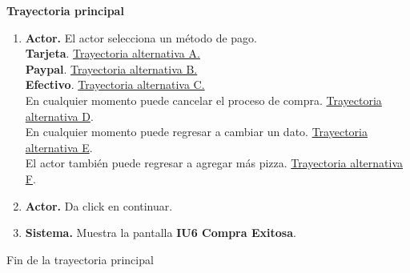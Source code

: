 \noindent \textbf{Trayectoria principal}

\begin{enumerate}
	\item {\textbf{Actor.}} El actor selecciona un método de pago.
	\\ \textbf{Tarjeta}. \hyperlink{TAA:CU4}{Trayectoria alternativa A.} 
	\\ \textbf{Paypal}. \hyperlink{TAB:CU4}{Trayectoria alternativa B.}
	\\ \textbf{Efectivo}. \hyperlink{TAC:CU4}{Trayectoria alternativa C.}
	\\ En cualquier momento puede cancelar el proceso de compra. \hyperlink{TAD:CU3}{Trayectoria alternativa D}.
	\\ En cualquier momento puede regresar a cambiar un dato. \hyperlink{TAE:CU3}{Trayectoria alternativa E}.
	\\ El actor también puede regresar a agregar más pizza. \hyperlink{TAF:CU3}{Trayectoria alternativa F}.

	
	\item {\textbf{Actor.}} \hypertarget{p5}{}Da click en continuar.
	
	\item \textbf{Sistema.} \hypertarget{p6}{}Muestra la pantalla \textbf{IU6 Compra Exitosa}.
		
\end{enumerate}	
Fin de la trayectoria principal
\\

